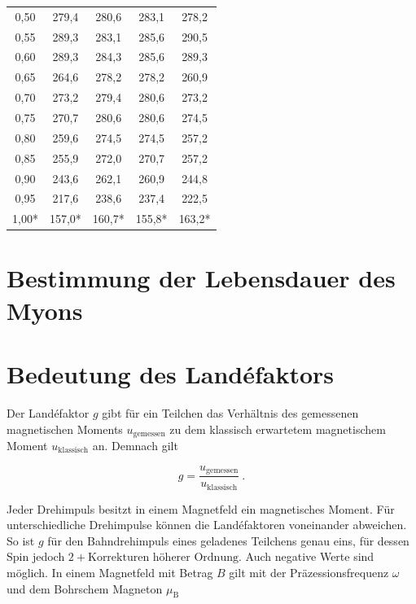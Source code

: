 \documentclass[a4paper,ngerman]{scrartcl}
\begin{document}
\begin{table}[tb!]
\begin{tabular}{ccccc}
0,50 & 279,4 & 280,6 & 283,1 & 278,2 \\
0,55 & 289,3 & 283,1 & 285,6 & 290,5 \\
0,60 & 289,3 & 284,3 & 285,6 & 289,3 \\
0,65 & 264,6 & 278,2 & 278,2 & 260,9 \\
0,70 & 273,2 & 279,4 & 280,6 & 273,2 \\
0,75 & 270,7 & 280,6 & 280,6 & 274,5 \\
0,80 & 259,6 & 274,5 & 274,5 & 257,2 \\
0,85 & 255,9 & 272,0 & 270,7 & 257,2 \\
0,90 & 243,6 & 262,1 & 260,9 & 244,8 \\
0,95 & 217,6 & 238,6 & 237,4 & 222,5 \\
1,00* & 157,0* & 160,7* & 155,8* & 163,2* \\
\bottomrule
\end{tabular}
\label{tab:fieldinhomogenities}
\end{table}








\section{Bestimmung der Lebensdauer des Myons}









\section{Bedeutung des Landéfaktors}

Der Landéfaktor $g$ gibt für ein Teilchen das Verhältnis des gemessenen magnetischen Moments $ u_{\mathrm{gemessen}}$ zu dem klassisch erwartetem magnetischem Moment $u_{\mathrm{klassisch}}$ an. Demnach gilt

\begin{equation}
g = \frac{ u_{\mathrm{gemessen}} }{u_{\mathrm{klassisch}} } ~.
\end{equation}

Jeder Drehimpuls besitzt in einem Magnetfeld ein magnetisches Moment. Für unterschiedliche Drehimpulse können die Landéfaktoren voneinander abweichen. So ist $g$ für den Bahndrehimpuls eines geladenes Teilchens genau eins, für dessen Spin jedoch $2 + \text{Korrekturen höherer Ordnung}$. Auch negative Werte sind möglich. In einem Magnetfeld mit Betrag $B$ gilt mit der Präzessionsfrequenz $\omega$ und dem Bohrschem Magneton $\mu_\mathrm{B}$
\end{document}
